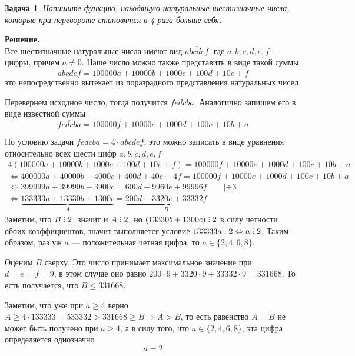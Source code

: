 \documentclass[12pt]{article}
\DeclareRobustCommand{\divby}{%
  \mathrel{\vbox{\baselineskip.65ex\lineskiplimit0pt\hbox{.}\hbox{.}\hbox{.}}}%
}
\newtheorem{problem}{Задача}
\newcommand\TheSolution{%
  \textbf{Решение.}\\%
}
\begin{document}
    \begin{problem}
        Напишите функцию, находящую натуральные шестизначные числа, которые при перевороте становятся в 4 раза больше себя.
    \end{problem}
    \TheSolution
    Все шестизначные натуральные числа имеют вид $\overline{abcdef}$, где $a, b, c, d, e, f$ — цифры, причем $a \neq 0$.
    Наше число можно также представить в виде такой суммы
    $$
        \overline{abcdef} = 100000a + 10000b + 1000c + 100d + 10e + f
    $$
    это непосредственно вытекает из поразрадного представления натуральных чисел.

    Перевернем исходное число, тогда получится $\overline{fedcba}$.
    Аналогично запишем его в виде известной суммы
    $$
        \overline{fedcba} = 100000f + 10000e + 1000d + 100c + 10b + a
    $$

    По условию задачи $\overline{fedcba} = 4 \cdot \overline{abcdef}$, это можно записать в виде уравнения относительно всех шести цифр $a, b, c, d, e, f$
    \begin{gather}
        4(100000a + 10000b + 1000c + 100d + 10e + f) = 100000f + 10000e + 1000d + 100c + 10b + a \nonumber \\
        \Longleftrightarrow 400000a + 40000b + 4000c + 400d + 40e + 4f = 100000f + 10000e + 1000d + 100c + 10b + a \nonumber \\
        \Longleftrightarrow 399999a + 39990b + 3900c = 600d + 9960e + 99996f \qquad |\div 3 \nonumber \\
        \Longleftrightarrow \underbrace{133333a + 13330b + 1300c}_A = \underbrace{200d + 3320e + 33332f}_B
    \end{gather}
    Заметим, что $B \divby 2$, значит и $A \divby 2$, но $(13330b + 1300c) \divby 2$ в силу четности обоих коэффициентов, значит выполняется условие $133333a \divby 2 \Leftrightarrow a \divby 2$. Таким образом, раз уж $a$ — положительная четная цифра, то $a \in \{2, 4, 6, 8\}$.

    Оценим $B$ сверху. Это число принимает максимальное значение при $d = e = f = 9$, в этом случае оно равно $200\cdot9 + 3320\cdot9 + 33332\cdot9 = 331668$. То есть получается,
    что $B \leqslant 331668$.

    Заметим, что уже при $a \geqslant 4$ верно $A \geqslant 4\cdot133333 = 533332 > 331668 \geqslant B \Rightarrow A > B$,
    то есть равенство $A = B$ не может быть получено при $a \geqslant 4$, а в силу того, что $a \in \{2, 4, 6, 8\}$, эта цифра определяется однозначно
    $$
        \boxed{a = 2}
    $$
\end{document}
